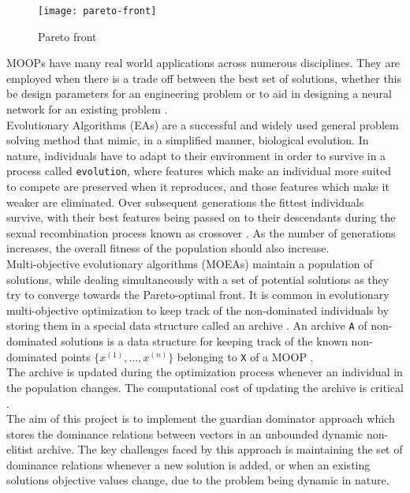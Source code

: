 \documentclass{ecmm427_assignment}
\begin{document}
\begin{figure}[h]
    \centering
    \texttt{[image: pareto-front]}
    \caption{Pareto front}
    \label{fig:pareto}
\end{figure}

MOOPs have many real world applications across numerous disciplines. They are employed when there is a trade off between the best set of solutions, whether this be design parameters for an engineering problem or to aid in designing a neural network for an existing problem \cite{Stewart2008}.\\
Evolutionary Algorithms (EAs) are a successful and widely used general problem solving method that mimic, in a simplified manner, biological evolution. In nature, individuals have to adapt to their environment in order to survive in a process called \texttt{evolution}, where features which make an individual more suited to compete are preserved when it reproduces, and those features which make it weaker are eliminated. Over subsequent generations the fittest individuals survive, with their best features being passed on to their descendants during the sexual recombination process known as crossover \cite{Coello2005}. As the number of generations increases, the overall fitness of the population should also increase.\\
Multi-objective evolutionary algorithms (MOEAs) maintain a population of solutions, while dealing simultaneously with a set of potential solutions as they try to converge towards the Pareto-optimal front. It is common in evolutionary multi-objective optimization to keep track of the non-dominated individuals by storing them in a special data structure called an archive \cite{Yuen2012}. An archive \texttt{A} of non-dominated solutions is a data structure for keeping track of the known non-dominated points $\{$$x^{(1)}$$, . . . ,$$x^{(n)}$$\}$ belonging to \texttt{X} of a MOOP \cite{Glasmachers2017}.\\
The archive is updated during the optimization process whenever an individual in the population changes. The computational cost of updating the archive is critical \cite{Altwaijry2012} \cite{Drozdik2015}.\\
The aim of this project is to implement the guardian dominator approach \cite{Fieldsend2014} which stores the dominance relations between vectors in an unbounded dynamic non-elitist archive. The key challenges faced by this approach is maintaining the set of dominance relations whenever a new solution is added, or when an existing solutions objective values change, due to the problem being dynamic in nature.
\end{document}
